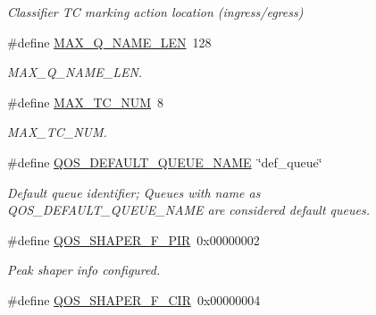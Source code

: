 \begin{DoxyCompactItemize}
\begin{DoxyCompactList}\small\item\em Classifier T\-C marking action location (ingress/egress) \end{DoxyCompactList}\item 
\hypertarget{group__FAPI__QOS__QUEUE_ga8c2658456d4f94c43de2b47e6cc488eb}{\#define \hyperlink{group__FAPI__QOS__QUEUE_ga8c2658456d4f94c43de2b47e6cc488eb}{M\-A\-X\-\_\-\-Q\-\_\-\-N\-A\-M\-E\-\_\-\-L\-E\-N}~128}\label{group__FAPI__QOS__QUEUE_ga8c2658456d4f94c43de2b47e6cc488eb}

\begin{DoxyCompactList}\small\item\em M\-A\-X\-\_\-\-Q\-\_\-\-N\-A\-M\-E\-\_\-\-L\-E\-N. \end{DoxyCompactList}\item 
\hypertarget{group__FAPI__QOS__QUEUE_ga75e5a2112ac055521c4cb0e64b278be8}{\#define \hyperlink{group__FAPI__QOS__QUEUE_ga75e5a2112ac055521c4cb0e64b278be8}{M\-A\-X\-\_\-\-T\-C\-\_\-\-N\-U\-M}~8}\label{group__FAPI__QOS__QUEUE_ga75e5a2112ac055521c4cb0e64b278be8}

\begin{DoxyCompactList}\small\item\em M\-A\-X\-\_\-\-T\-C\-\_\-\-N\-U\-M. \end{DoxyCompactList}\item 
\hypertarget{group__FAPI__QOS__QUEUE_gab80f9753502dd8a9811046d0c9436ca4}{\#define \hyperlink{group__FAPI__QOS__QUEUE_gab80f9753502dd8a9811046d0c9436ca4}{Q\-O\-S\-\_\-\-D\-E\-F\-A\-U\-L\-T\-\_\-\-Q\-U\-E\-U\-E\-\_\-\-N\-A\-M\-E}~\char`\"{}def\-\_\-queue\char`\"{}}\label{group__FAPI__QOS__QUEUE_gab80f9753502dd8a9811046d0c9436ca4}

\begin{DoxyCompactList}\small\item\em Default queue identifier; Queues with name as Q\-O\-S\-\_\-\-D\-E\-F\-A\-U\-L\-T\-\_\-\-Q\-U\-E\-U\-E\-\_\-\-N\-A\-M\-E are considered default queues. \end{DoxyCompactList}\item 
\hypertarget{group__FAPI__QOS__QUEUE_gaca804825b14c6e09547334ab4903f860}{\#define \hyperlink{group__FAPI__QOS__QUEUE_gaca804825b14c6e09547334ab4903f860}{Q\-O\-S\-\_\-\-S\-H\-A\-P\-E\-R\-\_\-\-F\-\_\-\-P\-I\-R}~0x00000002}\label{group__FAPI__QOS__QUEUE_gaca804825b14c6e09547334ab4903f860}

\begin{DoxyCompactList}\small\item\em Peak shaper info configured. \end{DoxyCompactList}\item 
\hypertarget{group__FAPI__QOS__QUEUE_ga7aa727cd5a533da5d21f3cf9f814b936}{\#define \hyperlink{group__FAPI__QOS__QUEUE_ga7aa727cd5a533da5d21f3cf9f814b936}{Q\-O\-S\-\_\-\-S\-H\-A\-P\-E\-R\-\_\-\-F\-\_\-\-C\-I\-R}~0x00000004}\label{group__FAPI__QOS__QUEUE_ga7aa727cd5a533da5d21f3cf9f814b936}


\end{DoxyCompactItemize}
